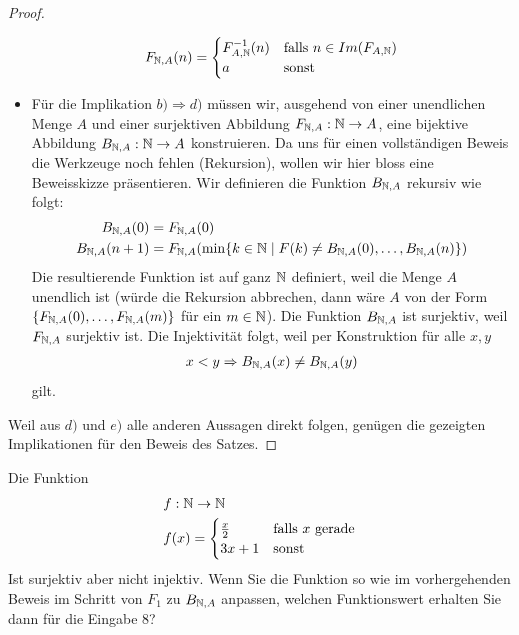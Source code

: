 \begin{proof}
\begin{itemize}
        \begin{align*}
            F_{\mathbb{N},A}(n)=
                \begin{cases}
                F_{A,\mathbb{N}}^{-1}(n)&\text{falls }n\in Im(F_{A,\mathbb{N}})\\
                a&\text{sonst}
                \end{cases}
        \end{align*}
        \item Für die Implikation $b)\Rightarrow d)$ müssen wir, ausgehend von einer unendlichen Menge $A$ und einer surjektiven Abbildung $F_{\mathbb{N},A}: \mathbb{N}\to A$, eine bijektive Abbildung $B_{\mathbb{N},A}: \mathbb{N}\to A$ konstruieren. Da uns für einen vollständigen Beweis die Werkzeuge noch fehlen (Rekursion), wollen wir hier bloss eine Beweisskizze präsentieren. Wir definieren die Funktion $B_{\mathbb{N},A}$ rekursiv wie folgt:
        \begin{align*}
        B_{\mathbb{N},A}(0) &= F_{\mathbb{N},A}(0)\\
        B_{\mathbb{N},A}(n+1) &= F_{\mathbb{N},A}(\min\{k\in\mathbb{N}\mid F(k)\neq B_{\mathbb{N},A}(0),\dots,B_{\mathbb{N},A}(n) \})
        \end{align*}
        Die resultierende Funktion ist auf ganz $\mathbb{N}$ definiert, weil die Menge $A$ unendlich ist (würde die Rekursion abbrechen, dann wäre $A$ von der Form $\{F_{\mathbb{N},A}(0),\dots,F_{\mathbb{N},A}(m)\}$ für ein $m\in\mathbb{N}$). Die Funktion $B_{\mathbb{N},A}$ ist surjektiv, weil $F_{\mathbb{N},A}$ surjektiv ist. Die Injektivität folgt, weil per Konstruktion für alle $x,y$
        \begin{align*}
        x<y \Rightarrow B_{\mathbb{N},A}(x) \neq B_{\mathbb{N},A}(y)
        \end{align*}
        gilt.
    \end{itemize}
    Weil aus $d)$ und $e)$ alle anderen Aussagen direkt folgen, genügen die gezeigten Implikationen für den Beweis des Satzes.
\end{proof}

\begin{ueb}
    Die Funktion
    \begin{align*}
        &f :\mathbb{N}\to\mathbb{N}\\
        &f(x) =
            \begin{cases}
                \frac{x}{2}&\text{falls $x$ gerade}\\
                3x+1&\text{sonst}
            \end{cases}
    \end{align*}
    Ist surjektiv aber nicht injektiv. Wenn Sie die Funktion so wie im vorhergehenden Beweis im Schritt von $F_1$ zu $B_{\mathbb{N},A}$ anpassen, welchen Funktionswert erhalten Sie dann für die Eingabe $8$?
\end{ueb}
\begin{lsg}~
\end{lsg}

